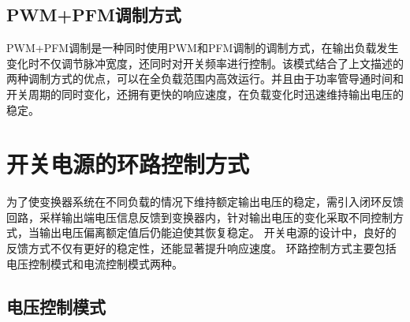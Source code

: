 \subsection{PWM+PFM调制方式}

PWM+PFM调制是一种同时使用PWM和PFM调制的调制方式，在输出负载发生变化时不仅调节脉冲宽度，还同时对开关频率进行控制。该模式结合了上文描述的两种调制方式的优点，可以在全负载范围内高效运行。并且由于功率管导通时间和开关周期的同时变化，还拥有更快的响应速度，在负载变化时迅速维持输出电压的稳定。


\section{开关电源的环路控制方式}
\label{sec:开关电源的环路控制方式}

为了使变换器系统在不同负载的情况下维持额定输出电压的稳定，需引入闭环反馈回路，采样输出端电压信息反馈到变换器内，针对输出电压的变化采取不同控制方式，当输出电压偏离额定值后仍能迫使其恢复稳定。
开关电源的设计中，良好的反馈方式不仅有更好的稳定性，还能显著提升响应速度。
环路控制方式主要包括电压控制模式和电流控制模式两种\cite{董海鹰2013,吴梦麟2019,陈瑶2023}。

\subsection{电压控制模式}


